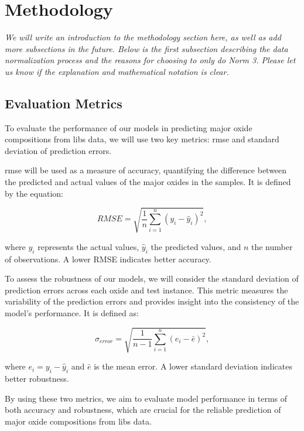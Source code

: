 \section{Methodology}\label{sec:methodology}
\textit{We will write an introduction to the methodology section here, as well as add more subsections in the future. Below is the first subsection describing the data normalization process and the reasons for choosing to only do Norm 3. Please let us know if the explanation and mathematical notation is clear.}

\subsection{Evaluation Metrics}
To evaluate the performance of our models in predicting major oxide compositions from \gls{libs} data, we will use two key metrics: \gls{rmse} and standard deviation of prediction errors.

\gls{rmse} will be used as a measure of accuracy, quantifying the difference between the predicted and actual values of the major oxides in the samples. It is defined by the equation:

\begin{equation}
    RMSE = \sqrt{\frac{1}{n} \sum_{i=1}^{n} (y_i - \hat{y}_i)^2},
\end{equation}

where $y_i$ represents the actual values, $\hat{y}_i$ the predicted values, and $n$ the number of observations. A lower RMSE indicates better accuracy.

To assess the robustness of our models, we will consider the standard deviation of prediction errors across each oxide and test instance. This metric measures the variability of the prediction errors and provides insight into the consistency of the model's performance. It is defined as:

\begin{equation}
    \sigma_{error} = \sqrt{\frac{1}{n-1} \sum_{i=1}^{n} (e_i - \bar{e})^2},
\end{equation}

where $e_i = y_i - \hat{y}_i$ and $\bar{e}$ is the mean error. A lower standard deviation indicates better robustness.

By using these two metrics, we aim to evaluate model performance in terms of both accuracy and robustness, which are crucial for the reliable prediction of major oxide compositions from \gls{libs} data.


